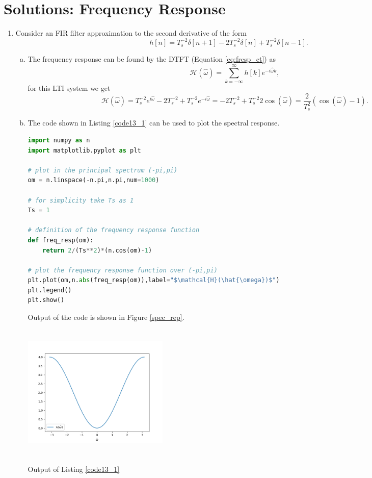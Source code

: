 \newpage
\section{Solutions: Frequency Response}


\begin{enumerate}
\item Consider an FIR filter approximation to the second derivative of the form
$$h[n]=T_{s}^{-2}\delta[n+1]-2T_{s}^{-2}\delta[n]+T_{s}^{-2}\delta[n-1].$$

\begin{enumerate}[a)]
\item The frequency response can be found by the DTFT (Equation \ref{eq:fresp_ct}) as
$$\mathcal{H}(\hat{\omega})=\sum_{k=-\infty}^{\infty}h[k]e^{-i\hat{\omega}k},$$
for this LTI system we get
$$\mathcal{H}(\hat{\omega})=T_{s}^{-2}e^{i\hat{\omega}}-2T_{s}^{-2}+T_{s}^{-2}e^{-i\hat{\omega}}=-2T_{s}^{-2}+T_{s}^{-2}2\cos(\hat{\omega})=\frac{2}{T_{s}^{2}}(\cos(\hat{\omega})-1).$$

\item The code shown in Listing \ref{code13_1} can be used to plot the spectral response. 
\begin{lstlisting}[language=Python, caption=Frequency response for finite difference,label=code13_1]
import numpy as n
import matplotlib.pyplot as plt

# plot in the principal spectrum (-pi,pi)
om = n.linspace(-n.pi,n.pi,num=1000)

# for simplicity take Ts as 1
Ts = 1

# definition of the frequency response function
def freq_resp(om):
    return 2/(Ts**2)*(n.cos(om)-1)

# plot the frequency response function over (-pi,pi)
plt.plot(om,n.abs(freq_resp(om)),label="$\mathcal{H}(\hat{\omega})$")
plt.legend()
plt.show()
\end{lstlisting}
Output of the code is shown in Figure \ref{spec_rep}.
\begin{marginfigure}
    \includegraphics[width=7.0cm,height=6.5cm]{ch11/figures/freq13.png}
    \caption{Output of Listing \ref{code13_1}}
    \label{spec_rep}
\end{marginfigure}


\end{enumerate}
\end{enumerate}
